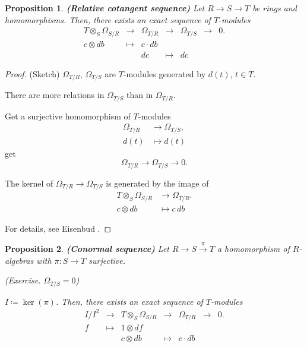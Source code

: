\documentclass[12pt]{article}
\newtheorem*{proposition}{Proposition}
\theoremstyle{definition}
\theoremstyle{remark}
\begin{document}
\begin{proposition}
\emph{\textbf{(Relative cotangent sequence)}} Let $R\rightarrow S\rightarrow T$ be rings and homomorphisms. Then, there exists an exact sequence of $T$-modules
\[
\begin{array}{rccclcc}
T\otimes_S\Omega_{S/R}&\longrightarrow&\Omega_{T/R}&\longrightarrow&\Omega_{T/S}&\longrightarrow&0.\\
c\otimes db&\longmapsto&c\cdot db\\
&&dc&\longmapsto&dc
\end{array}
\]
\end{proposition}

\begin{proof}
(Sketch) $\Omega_{T/R}$, $\Omega_{T/S}$ are $T$-modules generated by $d(t)$, $t\in T$.

There are more relations in $\Omega_{T/S}$ than in $\Omega_{T/R}$.

Get a surjective homomorphism of $T$-modules
\begin{align*}
\Omega_{T/R}&\longrightarrow\Omega_{T/S},\\
d(t)&\longmapsto d(t)
\end{align*}
get
\[\Omega_{T/R}\longrightarrow\Omega_{T/S}\longrightarrow0.\]

The kernel of $\Omega_{T/R}\rightarrow\Omega_{T/S}$ is generated by the image of
\begin{align*}
T\otimes_S\Omega_{S/R}&\longrightarrow\Omega_{T/R}.\\
c\otimes db&\longmapsto c\,db
\end{align*}

For details, see Eisenbud \cite{eisenbud2013commutative}.
\end{proof}

\begin{proposition}
\emph{\textbf{(Conormal sequence)}} Let $R\rightarrow S\xrightarrow{\pi}T$ a homomorphism of $R$-algebras with $\pi:S\rightarrow T$ surjective.

(Exercise. $\Omega_{T/S}=0$)

$I\coloneqq\ker(\pi)$. Then, there exists an exact sequence of $T$-modules
\[
\begin{array}{rcccrcc}
I/I^2&\longrightarrow&T\otimes_S\Omega_{S/R}&\longrightarrow&\Omega_{T/R}&\longrightarrow&0.\\
f&\longmapsto&1\otimes df\\
&&c\otimes db&\longmapsto&c\cdot db
\end{array}
\]
\end{proposition}
\end{document}

